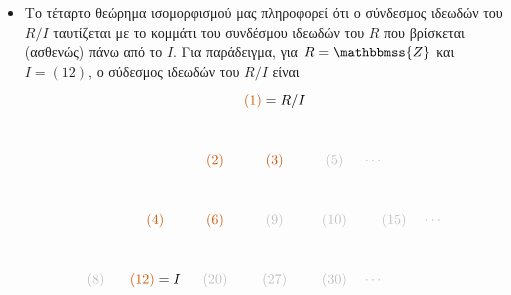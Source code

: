 \documentclass[12pt,a4paper,reqno]{amsart}
\makeatletter
\theoremstyle{definition}
\theoremstyle{remark}
\numberwithin{theorem}{section}
\numberwithin{exercise}{section}
\numberwithin{equation}{section}
\newcommand{\ZZ}{\mathbbmss{Z}}
\renewcommand{\to}{\rightarrow}
\newcommand{\rmKer}{\mathrm{Ker}}
\def\mathcolor#1#{\@mathcolor{#1}}
\def\@mathcolor#1#2#3{%
  \protect\leavevmode
  \begingroup
    \color#1{#2}#3%
  \endgroup
}
\makeatother
\begin{document}
\begin{itemize}
\[\begin{tikzpicture}[>=stealth,scale=.9]
\begin{scope}[shift={(8.5,0)}]
    \node at (0.8,1.6) {$\mathcolor{iceberg}{a}$};
    \node at (2.0,1.0) {$\mathcolor{applegreen}{b}$};
    \node at (5,1.0) {$= \phi(R)$};
    \node at (3.2,0.4) {$\mathcolor{burntorange}{c}$};
    \end{scope}

    \draw[->, thick] (6,5.5) -- node[above] {$\phi$} (8,5.5);
    \draw[->, thick] (3,4) -- node[left] {$\pi$} (3,2);
    \draw[->, thick] (5.5,1) -- node[below] {$\tilde{\phi}$} (8.5,1);
    \draw[->, thick] (10,2) -- node[right] {$\iota$} (10,4);

    \end{tikzpicture}
    \]
     μέσα από την κανονική προβολή $\pi : R \to R/\rmKer\phi$ και τον κανονικό εγκλεισμό $\iota : \phi(R) \to S$ έτσι ώστε 
    \[
    \phi = \iota \circ \tilde{\phi} \circ \pi.
    \]

    \item Το τέταρτο θεώρημα ισομορφισμού μας πληροφορεί ότι ο σύνδεσμος ιδεωδών του $R/I$ ταυτίζεται με το κομμάτι του συνδέσμου ιδεωδών του $R$ που βρίσκεται (ασθενώς) πάνω από το $I$. Για παράδειγμα, για $R = \ZZ$ και $I = (12)$, ο σύδεσμος ιδεωδών του $R/I$ είναι 
\[
\begin{tikzpicture}
    \begin{scope}[shift={(0,0)}]
        \node[color=gray!50] (8) at (0,0) {$(8)$};
        \node (4) at (1.5,1.5) {$\mathcolor{burntorange}{(4)}$};
        \node (2) at (3,3) {$\mathcolor{burntorange}{(2)}$};
        \node (1) at (4.5,4.5) {$\mathcolor{burntorange}{(1)} = R/I$};

        \node (12) at (1.5,0) {$\mathcolor{burntorange}{(12)} = I$};
        \node (6) at (3,1.5) {$\mathcolor{burntorange}{(6)}$};
        \node (3) at (4.5,3) {$\mathcolor{burntorange}{(3)}$};

        \node[color=gray!50] (20) at (3,0) {$(20)$};
        \node[color=gray!50] (9) at (4.5,1.5) {$(9)$};

        \node[color=gray!50] (27) at (4.5,0) {$(27)$};

        \node[color=gray!50] (30) at (6,0) {$(30)$};
        \node[color=gray!50] (10) at (6,1.5) {$(10)$};
        \node[color=gray!50] (5) at (6,3) {$(5)$};

        \node[color=gray!50] (15) at (7.5,1.5) {$(15)$};

        \node[gray!50] (dots1) at (7,3) {$\cdots$};
        \node[gray!50] (dots2) at (8.5,1.5) {$\cdots$};
        \node[gray!50] (dots3) at (7,0) {$\cdots$};


\end{scope}
\end{tikzpicture}\]
\end{itemize}
\end{document}
